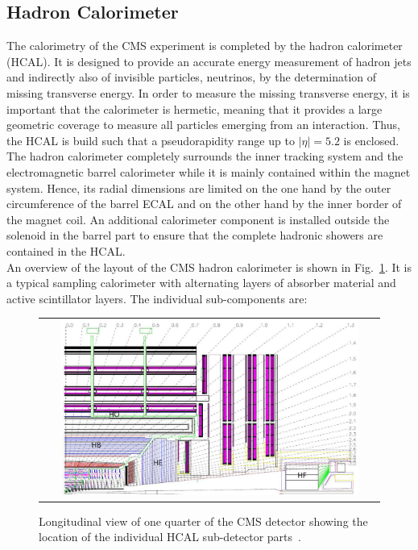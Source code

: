 \subsection{Hadron Calorimeter}
\label{subsec:cms_hcal}
The calorimetry of the CMS experiment is completed by the hadron calorimeter (HCAL). It is designed to provide an accurate energy measurement of hadron jets and indirectly also of invisible particles, \eg neutrinos, by the determination of missing transverse energy. In order to measure the missing transverse energy, it is important that the calorimeter is hermetic, meaning that it provides a large geometric coverage to measure all particles emerging from an interaction. Thus, the HCAL is build such that a pseudorapidity range up to $|\eta| = 5.2$ is enclosed. \\ 
The hadron calorimeter completely surrounds the inner tracking system and the electromagnetic barrel calorimeter while it is mainly contained within the magnet system. Hence, its radial dimensions are limited on the one hand by the outer circumference of the barrel ECAL and on the other hand by the inner border of the magnet coil. An additional calorimeter component is installed outside the solenoid in the barrel part to ensure that the complete hadronic showers are contained in the HCAL. \\
An overview of the layout of the CMS hadron calorimeter is shown in Fig.~\ref{fig:CMS_hcal}. It is a typical sampling calorimeter with alternating layers of absorber material and active scintillator layers. The individual sub-components are:
\begin{figure}[!tp]
  \centering
  \begin{tabular}{c}
    \includegraphics[width=0.9\textwidth]{figures/Figures_Experimental_Apparatus_HCAL.png}
  \end{tabular}
  \caption{Longitudinal view of one quarter of the CMS detector showing the location of the individual HCAL sub-detector parts~\cite{Chatrchyan:2008zzk}.}
  \label{fig:CMS_hcal}
\end{figure}
